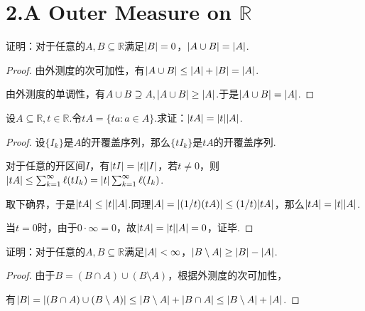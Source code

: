 \section{2.A Outer Measure on \(\mathbb{R}\)}

\begin{problem}[1]\label{2.A.1}
    证明：对于任意的\(A,B \subseteq \mathbb{R}\)满足\(\abs*{B}=0\)，\(\abs*{A \cup B}=\abs*{A}\).
\end{problem}

\begin{proof}
    由外测度的次可加性，有\(\abs*{A \cup B} \leq \abs*{A}+\abs*{B}=\abs*{A}\).

    由外测度的单调性，有\(A \cup B \supseteq A, \abs*{A \cup B} \geq \abs*{A}\).于是\(\abs*{A \cup B}=\abs*{A}\).
\end{proof}

\begin{problem}[2]\label{2.A.2}
    设\(A \subseteq \mathbb{R}, t \in \mathbb{R}\).令\(tA=\{ta:a \in A\}\).求证：\(\abs*{tA}=\abs*{t}\abs*{A}\).
\end{problem}

\begin{proof}
    设\(\{I_k\}\)是\(A\)的开覆盖序列，那么\(\{tI_k\}\)是\(tA\)的开覆盖序列.

    对于任意的开区间\(I\)，有\(\abs*{tI}=\abs*{t}\abs*{I}\)，若\(t \ne 0\)，则\(\abs*{tA} \leq \sum_{k=1}^\infty \ell(tI_k)=\abs*{t} \sum_{k=1}^\infty \ell(I_k)\).

    取下确界，于是\(\abs*{tA} \leq \abs*{t}\abs*{A}\).同理\(\abs*{A}=\abs*{(1/t)(tA)} \leq (1/t)\abs*{tA}\)，那么\(\abs*{tA}=\abs*{t}\abs*{A}\).

    当\(t=0\)时，由于\(0 \cdot \infty=0\)，故\(\abs*{tA}=\abs*{t}\abs*{A}=0\)，证毕.
\end{proof}

\begin{problem}[3]\label{2.A.3}
    证明：对于任意的\(A,B \subseteq \mathbb{R}\)满足\(\abs*{A}<\infty\)，\(\abs*{B \setminus A} \geq \abs*{B}-\abs*{A}\).
\end{problem}

\begin{proof}
    由于\(B=(B \cap A) \cup (B \setminus A)\)，根据外测度的次可加性，
    
    有\(\abs*{B}=\abs*{(B \cap A) \cup (B \setminus A)} \leq \abs*{B \setminus A}+\abs*{B \cap A} \leq \abs*{B \setminus A}+\abs*{A}\).
\end{proof}

